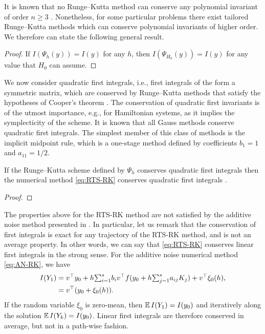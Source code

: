 \documentclass[10pt]{article}
\begin{document}
It is known that no Runge--Kutta method can conserve any polynomial invariant of order $n \geq 3$ \cite[Theorem IV.3.3]{HLW06}. Nonetheless, for some particular problems there exist tailored Runge--Kutta methods which can conserve polynomial invariants of higher order. We therefore can state the following general result.
\begin{theorem}\label{thm:PolyInvariants} 
\end{theorem}
\begin{proof} If $I(\Psi_h(y)) = I(y)$ for any $h$, then $I(\Psi_{H_0}(y)) = I(y)$  for any value that $H_0$ can assume.
\end{proof}

We now consider quadratic first integrals, i.e., first integrals of the form  a symmetric matrix, which are conserved by Runge--Kutta methods that satisfy the hypotheses of Cooper's theorem \cite[Theorem IV.2.2]{HLW06}. The conservation of quadratic first invariants is of the utmost importance, e.g., for Hamiltonian systems, as it implies the symplecticity of the scheme. It is known \cite[Theorem IV.2.1]{HLW06} that all Gauss methods conserve quadratic first integrals. The simplest member of this class of methods is the implicit midpoint rule, which is a one-stage method defined by coefficients $b_1 = 1$ and $a_{11} = 1/2$.
\begin{corollary}\label{thm:QuadraticInvariants} If the Runge--Kutta scheme defined by $\Psi_h$ conserves quadratic first integrals then the numerical method \eqref{eq:RTS-RK} conserves quadratic first integrals .
\end{corollary}
\begin{proof}  \end{proof}

The properties above for the RTS-RK method are not satisfied by the additive noise method presented in \cite{CGS17}. In particular, let us remark that the conservation of first integrals is exact for any trajectory of the RTS-RK method, and is not an average property. In other words, we can say that \eqref{eq:RTS-RK} conserves linear first integrals in the strong sense. For the additive noise numerical method \eqref{eq:AN-RK}, we have
\begin{equation}
	\begin{aligned}
	I(Y_1) &= v^\top  y_0 + h {\textstyle\sum}_{i=1}^s b_iv^\top  f(y_0 + h{\textstyle\sum}_{j=1}^{s} a_{ij}K_j) + v^\top  \xi_0(h), \\
	&= v^\top  (y_0 + \xi_0(h)).
	\end{aligned}
\end{equation}
If the random variable $\xi_0$ is zero-mean, then $\operatorname{\mathbb{E}} I(Y_1) = I(y_0)$ and iteratively along the solution $\operatorname{\mathbb{E}} I(Y_k) = I(y_0)$. Linear first integrals are therefore conserved in average, but not in a path-wise fashion.
\end{document}
